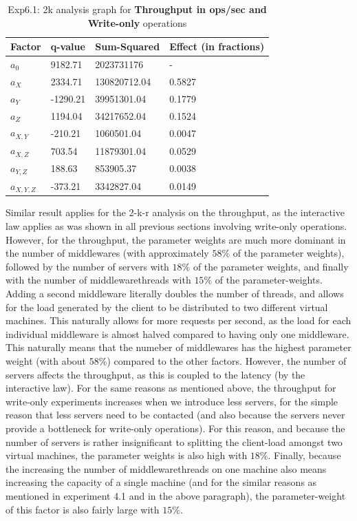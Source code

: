\documentclass[11pt,a4paper]{article}
\begin{document}
\begin{center}
	\begin{table}[H]
	\center
    \begin{tabular}{ | l | l | l | l |  }
    \hline
    Factor & q-value & Sum-Squared & Effect (in fractions) \\ \hline
    $a_0$ & 9182.71& 2023731176 & - \\ \hline
    $a_X$ & 2334.71 & 130820712.04 & 0.5827	 \\ \hline
    $a_Y$ & -1290.21 & 39951301.04 & 0.1779 \\ \hline
    $a_Z$ & 1194.04  & 34217652.04	 & 0.1524 \\ \hline
   	$a_{X, Y}$ & -210.21	 & 1060501.04	 & 0.0047 \\ \hline
    $a_{X, Z}$ & 703.54	 & 11879301.04 & 0.0529 \\ \hline
    $a_{Y, Z}$ & 188.63	 & 853905.37 & 0.0038 \\ \hline
    $a_{X, Y, Z}$ & -373.21 & 3342827.04 & 0.0149 \\
    \hline
    \end{tabular}
  	\caption{Exp6.1: 2k analysis graph for \textbf{Throughput in ops/sec and Write-only} operations}	 
  	\end{table}  
\end{center}

Similar result applies for the 2-k-r analysis on the throughput, as the interactive law applies as was shown in all previous sections involving write-only operations.
However, for the throughput, the parameter weights are much more dominant in the number of middlewares (with approximately $ 58 \% $ of the parameter weights), followed by the number of servers with $ 18 \% $ of the parameter weights, and finally with the number of 
middlewarethreads with $ 15 \% $ of the parameter-weights.
Adding a second middleware literally doubles the number of threads, and allows for the load generated by the client to be distributed to two different virtual machines.
This naturally allows for more requests per second, as the load for each individual middleware is almost halved compared to having only one middleware.
This naturally means that the numeber of middlewares has the highest parameter weight (with about $ 58 \% $) compared to the other factors.
However, the number of servers affects the throughput, as this is coupled to the latency (by the interactive law). 
For the same reasons as mentioned above, the throughput for write-only experiments increases when we introduce less servers, for the simple reason that less servers need to be contacted (and also because the servers never provide a bottleneck for write-only operations).
For this reason, and because the number of servers is rather insignificant to splitting the client-load amongst two virtual machines, the parameter weights is also high with $ 18 \% $.
Finally, because the increasing the number of middlewarethreads on one machine also means increasing the capacity of a single machine (and for the similar reasons as mentioned in experiment 4.1 and in the above paragraph), the parameter-weight of this factor is also fairly large with $ 15 \% $. 
\end{document}
